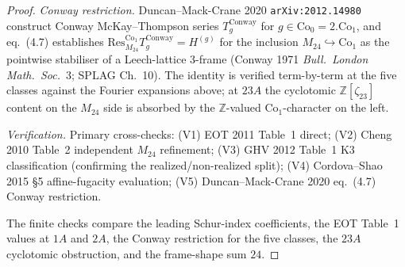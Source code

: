 \begin{proof}
\emph{Conway restriction.} Duncan--Mack-Crane 2020
\texttt{arXiv:2012.14980} construct Conway McKay--Thompson
series $T_g^{\mathrm{Conway}}$ for $g \in \mathrm{Co}_0 =
2.\mathrm{Co}_1$, and eq.~(4.7) establishes
$\mathrm{Res}^{\mathrm{Co}_1}_{M_{24}} T_g^{\mathrm{Conway}}
= H^{(g)}$ for the inclusion
$M_{24} \hookrightarrow \mathrm{Co}_1$ as the pointwise
stabiliser of a Leech-lattice $3$-frame (Conway 1971
\emph{Bull.\ London Math.\ Soc.}~3; SPLAG Ch.\ 10). The
identity is verified term-by-term at the five classes
against the Fourier expansions above; at $23A$ the cyclotomic
$\mathbb Z[\zeta_{23}]$ content on the $M_{24}$ side is
absorbed by the $\mathbb Z$-valued
$\mathrm{Co}_1$-character on the left.

\emph{Verification.} Primary cross-checks:
(V1) EOT 2011 Table~1 direct;
(V2) Cheng 2010 Table~2 independent $M_{24}$ refinement;
(V3) GHV 2012 Table~1 K3 classification
(confirming the realized/non-realized split);
(V4) Cordova--Shao 2015 \S 5 affine-fugacity evaluation;
(V5) Duncan--Mack-Crane 2020 eq.~(4.7) Conway restriction.

The finite checks compare the leading Schur-index coefficients, the
EOT Table~1 values at $1A$ and $2A$, the Conway restriction for the
five classes, the $23A$ cyclotomic obstruction, and the frame-shape
sum $24$.
\end{proof}

